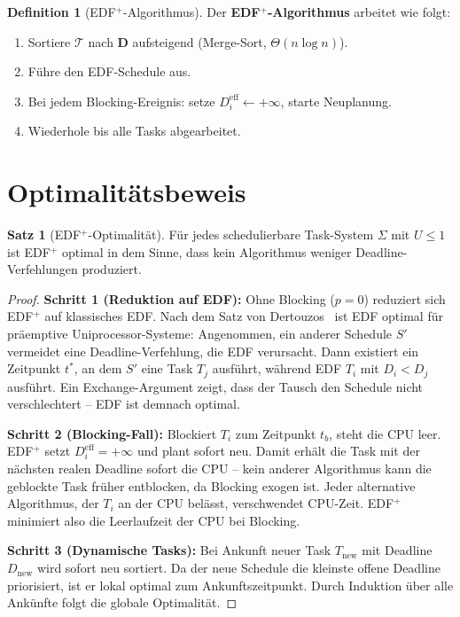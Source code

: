 ﻿\documentclass[a4paper,12pt]{scrreprt}
\theoremstyle{definition}
\newtheorem{definition}{Definition}[chapter]
\newtheorem{satz}{Satz}[chapter]
\begin{document}
	\begin{definition}[EDF$^+$-Algorithmus]\label{def:edfplus}
		Der \textbf{EDF$^+$-Algorithmus} arbeitet wie folgt:
		\begin{enumerate}
			\item Sortiere $\mathcal{T}$ nach $\mathbf{D}$ aufsteigend
			(Merge-Sort, $\Theta(n \log n)$).
			\item Führe den EDF-Schedule aus.
			\item Bei jedem Blocking-Ereignis: setze $D_i^{\mathrm{eff}} \leftarrow +\infty$,
			starte Neuplanung.
			\item Wiederhole bis alle Tasks abgearbeitet.
		\end{enumerate}
	\end{definition}
	
	\section{Optimalitätsbeweis}
	
	\begin{satz}[EDF$^+$-Optimalität]\label{satz:edfopt}
		Für jedes schedulierbare Task-System $\Sigma$ mit $U \leq 1$ ist
		EDF$^+$ optimal in dem Sinne, dass kein Algorithmus weniger
		Deadline-Verfehlungen produziert.
	\end{satz}
	
	\begin{proof}
		\textbf{Schritt 1 (Reduktion auf EDF):} Ohne Blocking ($p = 0$) reduziert
		sich EDF$^+$ auf klassisches EDF. Nach dem Satz von Dertouzos~\cite{Dertouzos1974}
		ist EDF optimal für präemptive Uniprocessor-Systeme: Angenommen, ein
		anderer Schedule $S'$ vermeidet eine Deadline-Verfehlung, die EDF verursacht.
		Dann existiert ein Zeitpunkt $t^*$, an dem $S'$ eine Task $T_j$ ausführt,
		während EDF $T_i$ mit $D_i < D_j$ ausführt. Ein Exchange-Argument zeigt,
		dass der Tausch den Schedule nicht verschlechtert -- EDF ist demnach optimal.
		
		\textbf{Schritt 2 (Blocking-Fall):} Blockiert $T_i$ zum Zeitpunkt $t_b$,
		steht die CPU leer. EDF$^+$ setzt $D_i^{\mathrm{eff}} = +\infty$ und
		plant sofort neu. Damit erhält die Task mit der nächsten realen Deadline
		sofort die CPU -- kein anderer Algorithmus kann die geblockte Task früher
		entblocken, da Blocking exogen ist. Jeder alternative Algorithmus, der
		$T_i$ an der CPU belässt, verschwendet CPU-Zeit. EDF$^+$ minimiert also
		die Leer\-laufzeit der CPU bei Blocking.
		
		\textbf{Schritt 3 (Dynamische Tasks):} Bei Ankunft neuer Task $T_{\text{new}}$
		mit Deadline $D_{\text{new}}$ wird sofort neu sortiert. Da der neue Schedule
		die kleinste offene Deadline priorisiert, ist er lokal optimal zum
		Ankunftszeitpunkt. Durch Induktion über alle Ankünfte folgt die globale
		Optimalität.
	\end{proof}
	
\end{document}
